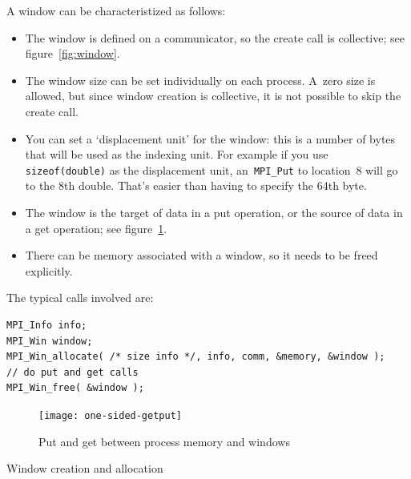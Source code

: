 A window can be characteristized as follows:
\begin{itemize}
\item The window is defined on a communicator, so the create call
  is collective; see figure~\ref{fig:window}. 
\item The window size can be set individually on each process.
  A~zero size is allowed, but since window creation is collective,
  it is not possible to skip the create call.
\item You can set a `displacement unit' for the window: this is a number of
  bytes that will be used as the indexing unit. For example if you use
  \lstinline{sizeof(double)} as the displacement unit,
  an~\lstinline{MPI_Put} to location~8 will go to the 8th double.
  That's easier than having to specify the 64th byte.
\item The window is the target of data in a put operation, or the
  source of data in a get operation; see figure~\ref{fig:putget}.
\item There can be memory associated with a window, so it needs to be
  freed explicitly.
\end{itemize}

The typical calls involved are:
\lstset{style=reviewcode,language=C}
\begin{lstlisting}
MPI_Info info;
MPI_Win window;
MPI_Win_allocate( /* size info */, info, comm, &memory, &window );
// do put and get calls
MPI_Win_free( &window );
\end{lstlisting}

\begin{figure}[ht]
  \texttt{[image: one-sided-getput]}
  \caption{Put and get between process memory and windows}
  \label{fig:putget}
\end{figure}

 {Window creation and allocation}
\label{sec:win-alloc}

